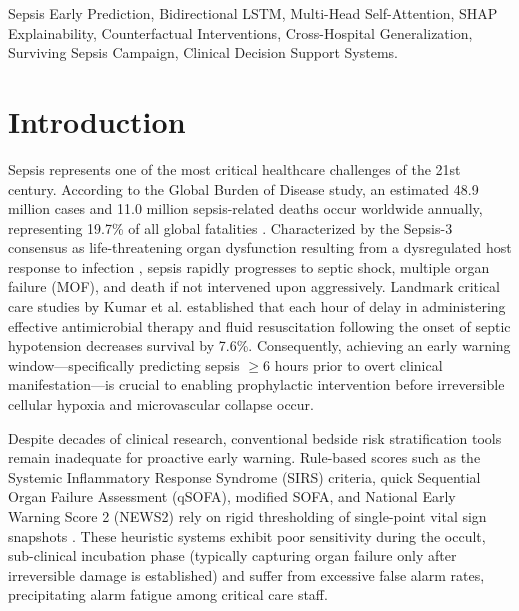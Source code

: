 \documentclass[conference]{IEEEtran}
\begin{document}
\begin{IEEEkeywords}
Sepsis Early Prediction, Bidirectional LSTM, Multi-Head Self-Attention, SHAP Explainability, Counterfactual Interventions, Cross-Hospital Generalization, Surviving Sepsis Campaign, Clinical Decision Support Systems.
\end{IEEEkeywords}

\section{Introduction}
Sepsis represents one of the most critical healthcare challenges of the 21st century. According to the Global Burden of Disease study, an estimated 48.9 million cases and 11.0 million sepsis-related deaths occur worldwide annually, representing 19.7\% of all global fatalities \cite{rudd2020}. Characterized by the Sepsis-3 consensus as life-threatening organ dysfunction resulting from a dysregulated host response to infection \cite{singer2016}, sepsis rapidly progresses to septic shock, multiple organ failure (MOF), and death if not intervened upon aggressively. Landmark critical care studies by Kumar et al. \cite{kumar2006} established that each hour of delay in administering effective antimicrobial therapy and fluid resuscitation following the onset of septic hypotension decreases survival by 7.6\%. Consequently, achieving an early warning window---specifically predicting sepsis $\ge 6$ hours prior to overt clinical manifestation---is crucial to enabling prophylactic intervention before irreversible cellular hypoxia and microvascular collapse occur.

Despite decades of clinical research, conventional bedside risk stratification tools remain inadequate for proactive early warning. Rule-based scores such as the Systemic Inflammatory Response Syndrome (SIRS) criteria, quick Sequential Organ Failure Assessment (qSOFA), modified SOFA, and National Early Warning Score 2 (NEWS2) rely on rigid thresholding of single-point vital sign snapshots \cite{bone1992, seymour2016}. These heuristic systems exhibit poor sensitivity during the occult, sub-clinical incubation phase (typically capturing organ failure only after irreversible damage is established) and suffer from excessive false alarm rates, precipitating alarm fatigue among critical care staff.
\end{document}
